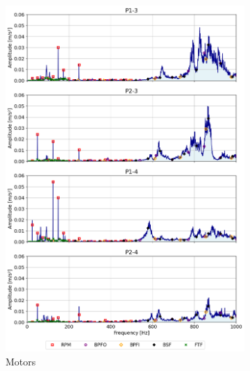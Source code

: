 \begin{figure}[h]
\begin{subfigure}[b]{0.24\textwidth}
        \includegraphics[width=\textwidth]{assets/results/defects/pumps.png}
        \caption{Motors}
    \end{subfigure}
    \hfill
    \begin{subfigure}[b]{0.24\textwidth}

\end{subfigure}
\end{figure}
